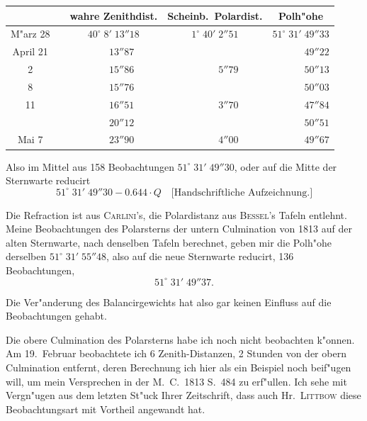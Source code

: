 \documentclass[12pt,a4paper]{article}
\begin{document}
\begin{center}
\begin{tabular}{c|c|c|c|c}
\toprule
& & wahre Zenithdist. & Scheinb.~Polardist. & Polh"ohe \\
\midrule
M"arz 28 & & $40^{\circ}\;8'\;13''18$ & $1^{\circ}\;40'\;2''51$ & $51^{\circ}\;31'\;49''33$ \\
April 21 & & $\phantom{40^{\circ}\;}13''87$ & $\phantom{1^{\circ}\;40'\;}\phantom{00}$ & $\phantom{51^{\circ}\;31'\;}49''22$ \\
\phantom{21} 2 & & $\phantom{40^{\circ}\;}15''86$ & $\phantom{1^{\circ}\;40'\;}5''79$ & $\phantom{51^{\circ}\;31'\;}50''13$ \\
\phantom{21} 8 & & $\phantom{40^{\circ}\;}15''76$ & & $\phantom{51^{\circ}\;31'\;}50''03$ \\
\phantom{21} 11 & & $\phantom{40^{\circ}\;}16''51$ & $\phantom{1^{\circ}\;40'\;}3''70$ & $\phantom{51^{\circ}\;31'\;}47''84$ \\
\phantom{21} & & $\phantom{40^{\circ}\;}20''12$ & & $\phantom{51^{\circ}\;31'\;}50''51$ \\
Mai \phantom{0}7 & & $\phantom{40^{\circ}\;}23''90$ & $\phantom{1^{\circ}\;40'\;}4''00$ & $\phantom{51^{\circ}\;31'\;}49''67$ \\
\bottomrule
\end{tabular}
\end{center}

\begin{center}
Also im Mittel aus 158 Beobachtungen $51^{\circ}\;31'\;49''30$, oder auf die Mitte der Sternwarte reducirt
\[51^{\circ}\;31'\;49''30 - 0.644 \cdot Q \quad \text{[Handschriftliche Aufzeichnung.]}\]
\end{center}

Die Refraction ist aus \textsc{Carlini}'s, die Polardistanz aus \textsc{Bessel}'s Tafeln entlehnt. Meine Beobachtungen
des Polarsterns der untern Culmination von 1813 auf der alten Sternwarte, nach denselben Tafeln berechnet,
geben mir die Polh"ohe derselben $51^{\circ}\;31'\;55''48$, also auf die neue Sternwarte reducirt,
136 Beobachtungen,
\[51^{\circ}\;31'\;49''37.\]

Die Ver"anderung des Balancirgewichts hat also gar keinen Einfluss auf die Beobachtungen gehabt.

\newpage

Die obere Culmination des Polarsterns habe ich noch nicht beobachten k"onnen. Am 19.~Februar
beobachtete ich 6 Zenith-Distanzen, 2 Stunden von der obern Culmination entfernt, deren Berechnung
ich hier als ein Beispiel noch beif"ugen will, um mein Versprechen in der M.~C.~1813 S.~484 zu erf"ullen.
Ich sehe mit Vergn"ugen aus dem letzten St"uck Ihrer Zeitschrift, dass auch Hr.~\textsc{Littbow} diese
Beobachtungsart mit Vortheil angewandt hat.
\end{document}
